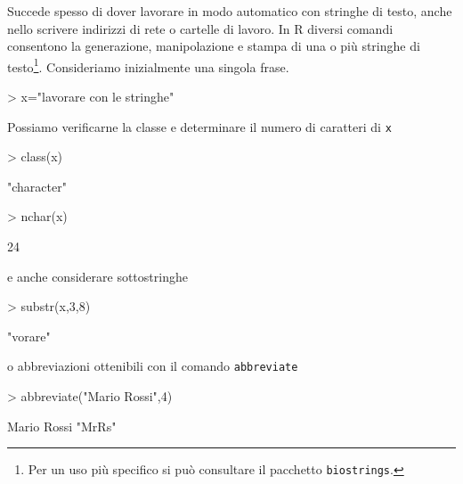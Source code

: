 \documentclass[onecolumn,12pt]{book}
\begin{document}
Succede spesso di dover lavorare in modo automatico con stringhe di testo, anche nello scrivere indirizzi di rete o cartelle di lavoro. In  \textsf{R} diversi comandi consentono la  generazione, manipolazione e stampa di una o pi\`u stringhe di testo\footnote{Per un  uso pi\`u specifico si pu\`o consultare il pacchetto \texttt{biostrings}.}. Consideriamo inizialmente una singola frase.
\begin{Schunk}
\begin{Sinput}
> x="lavorare con le stringhe"
\end{Sinput}
\end{Schunk}
Possiamo verificarne la classe e determinare il numero di caratteri di \texttt{x}
\begin{Schunk}
\begin{Sinput}
> class(x)
\end{Sinput}
\begin{Soutput}
[1] "character"
\end{Soutput}
\begin{Sinput}
> nchar(x)
\end{Sinput}
\begin{Soutput}
[1] 24
\end{Soutput}
\end{Schunk}
e anche considerare sottostringhe
\begin{Schunk}
\begin{Sinput}
> substr(x,3,8)
\end{Sinput}
\begin{Soutput}
[1] "vorare"
\end{Soutput}
\end{Schunk}
o  abbreviazioni ottenibili con il comando \texttt{abbreviate} 
\begin{Schunk}
\begin{Sinput}
> abbreviate("Mario Rossi",4)
\end{Sinput}
\begin{Soutput}
Mario Rossi 
     "MrRs" 
\end{Soutput}
\end{Schunk}
\end{document}
